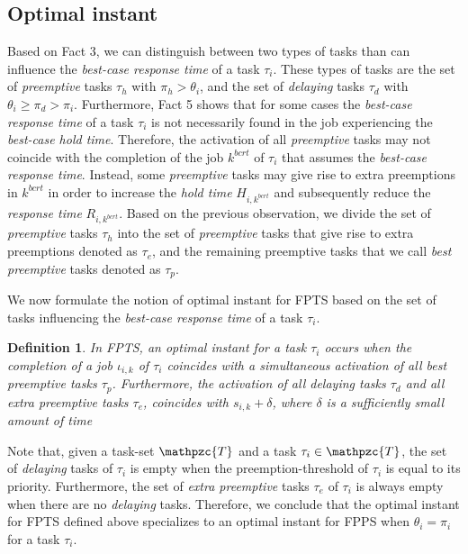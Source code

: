 \documentclass[fleqn]{article}
\newtheorem{definition}{Definition}
\begin{document}
\subsection{Optimal instant}
Based on Fact 3, we can distinguish between two types of tasks than can influence the \textit{best-case response time} of a task $\tau_i$. These types of tasks are the set of \textit{preemptive} tasks $\tau_h$ with $\pi_h > \theta_i$, and the set of \textit{delaying} tasks $\tau_d$ with $\theta_i \geq \pi_d > \pi_i$. Furthermore, Fact 5 shows that for some cases the \textit{best-case response time} of a task $\tau_i$ is not necessarily found in the job experiencing the \textit{best-case hold time}. Therefore, the activation of all \textit{preemptive} tasks may not coincide with the completion of the job $k^{bcrt}$ of $\tau_i$ that assumes the \textit{best-case response time}. Instead, some \textit{preemptive} tasks may give rise to extra preemptions in $k^{bcrt}$ in order to increase the \textit{hold time} $H_{i,k^{bcrt}}$ and subsequently reduce the \textit{response time} $R_{i,k^{bcrt}}$. Based on the previous observation, we divide the set of \textit{preemptive} tasks $\tau_h$ into the set of \textit{preemptive} tasks that give rise to extra preemptions denoted as $\tau_e$, and the remaining preemptive tasks that we call \textit{best preemptive} tasks denoted as $\tau_p$.

We now formulate the notion of optimal instant for FPTS based on the set of tasks influencing the \textit{best-case response time} of a task $\tau_i$.

\begin{definition}
	In FPTS, an optimal instant for a task $\tau_i$ occurs when the completion of a job $\iota_{i,k}$ of $\tau_i$ coincides with a simultaneous activation of all \textit{best preemptive} tasks $\tau_p$. Furthermore, the activation of all delaying tasks $\tau_d$ and all \textit{extra preemptive} tasks $\tau_e$, coincides with $s_{i,k}+\delta$, where $\delta$ is a sufficiently small amount of time 
\end{definition}

Note that, given a task-set $\mathpzc{T}$ and a task $\tau_i \in \mathpzc{T}$, the set of \textit{delaying} tasks of $\tau_i$ is empty when the preemption-threshold of $\tau_i$ is equal to its priority. Furthermore, the set of \textit{extra preemptive} tasks $\tau_e$ of $\tau_i$ is always empty when there are no \textit{delaying} tasks. Therefore, we conclude that the optimal instant for FPTS defined above specializes to an optimal instant for FPPS when $\theta_i = \pi_i$ for a task $\tau_i$. 
\end{document}
